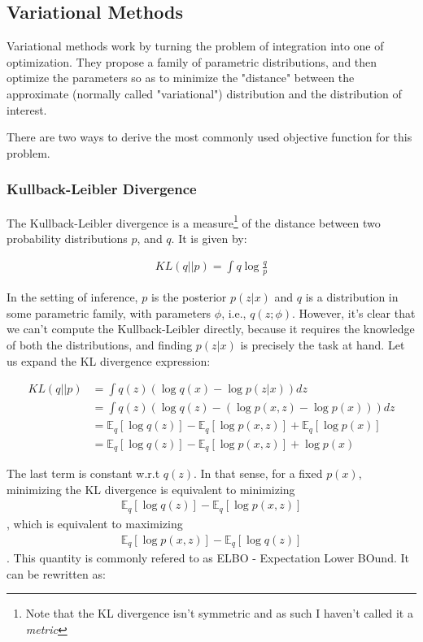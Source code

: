 \subsection{Variational Methods}
\label{subsection:variational}
Variational methods work by turning the problem of integration into one of
optimization. They propose a family of parametric distributions, and then
optimize the parameters so as to minimize the "distance" between the approximate
(normally called "variational") distribution and the distribution of interest.

There are two ways to derive the most commonly used objective function for
this problem.

\subsubsection{Kullback-Leibler Divergence}
\label{subsubsection:kldiv}

The Kullback-Leibler divergence is a measure\footnote{Note that the KL divergence
isn't symmetric and as such I haven't called it a \emph{metric}} of the distance
between two probability distributions $p$, and $q$. It is given by:

\begin{align}
    KL(q||p) = \int q \log\frac{q}{p}
\end{align}

In the setting of inference, $p$ is the posterior $p(z|x)$ and $q$ is a distribution
in some parametric family, with parameters $\phi$, i.e., $q(z; \phi)$. However,
it's clear that we can't compute the Kullback-Leibler directly, because it
requires the knowledge of both the distributions, and finding $p(z|x)$ is precisely
the task at hand. Let us expand the KL divergence expression:

\begin{align}
    KL(q||p) &= \int q(z) (\log q(x) - \log p(z|x)) dz \\
             &= \int q(z) (\log q(z) - (\log p(x, z) - \log p(x))) dz \\
             &= \mathbb{E}_q [\log q(z)] - \mathbb{E}_q [\log p(x, z)] + \mathbb{E}_q [\log p(x)] \\
             &= \mathbb{E}_q [\log q(z)] - \mathbb{E}_q [\log p(x, z)] + \log p(x)
\end{align}

The last term is constant w.r.t $q(z)$. In that sense, for a fixed $p(x)$,
minimizing the KL divergence is equivalent to minimizing
\begin{align}
    \mathbb{E}_q [\log q(z)] - \mathbb{E}_q [\log p(x, z)]
\end{align}, which is equivalent to maximizing
\begin{align}
    \mathbb{E}_q [\log p(x, z)] - \mathbb{E}_q [\log q(z)] \label{eq:elbokldiv}
\end{align}. This quantity is commonly refered to as ELBO - Expectation Lower BOund.
It can be rewritten as:

